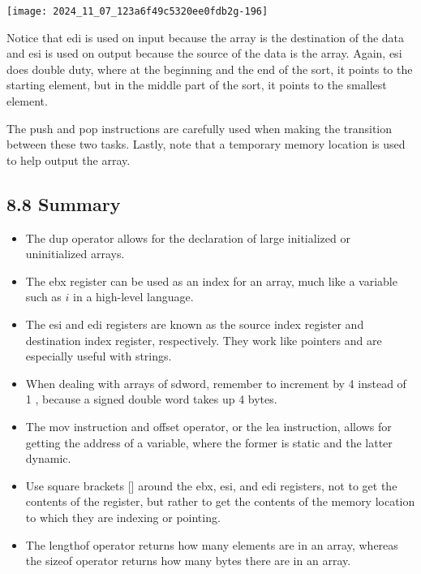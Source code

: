 \documentclass[10pt]{article}
\begin{document}
\begin{center}
\texttt{[image: 2024\_11\_07\_123a6f49c5320ee0fdb2g-196]}
\end{center}

Notice that edi is used on input because the array is the destination of the data and esi is used on output because the source of the data is the array. Again, esi does double duty, where at the beginning and the end of the sort, it points to the starting element, but in the middle part of the sort, it points to the smallest element.

The push and pop instructions are carefully used when making the transition between these two tasks. Lastly, note that a temporary memory location is used to help output the array.

\subsection*{8.8 Summary}
\begin{itemize}
  \item The dup operator allows for the declaration of large initialized or uninitialized arrays.
  \item The ebx register can be used as an index for an array, much like a variable such as $i$ in a high-level language.
  \item The esi and edi registers are known as the source index register and destination index register, respectively. They work like pointers and are especially useful with strings.
  \item When dealing with arrays of sdword, remember to increment by 4 instead of 1 , because a signed double word takes up 4 bytes.
  \item The mov instruction and offset operator, or the lea instruction, allows for getting the address of a variable, where the former is static and the latter dynamic.
  \item Use square brackets [] around the ebx, esi, and edi registers, not to get the contents of the register, but rather to get the contents of the memory location to which they are indexing or pointing.
  \item The lengthof operator returns how many elements are in an array, whereas the sizeof operator returns how many bytes there are in an array.
\end{itemize}
\end{document}
